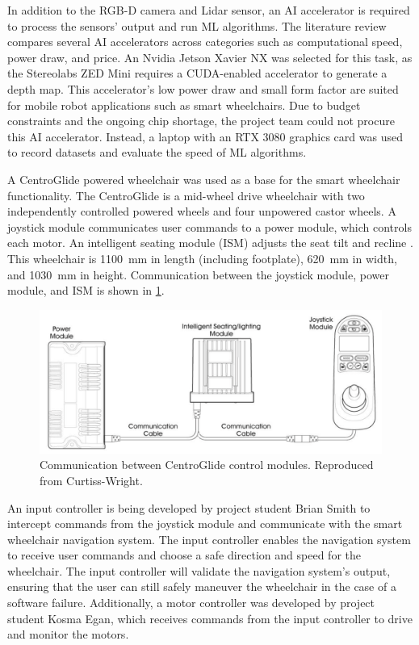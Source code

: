 In addition to the RGB-D camera and Lidar sensor, an AI accelerator is required to process the sensors'
output and run ML algorithms. The literature review compares several AI accelerators across categories
such as computational speed, power draw, and price. An Nvidia Jetson Xavier NX was selected for this task,
as the Stereolabs ZED Mini requires a CUDA-enabled accelerator to generate a depth map. This accelerator's
low power draw and small form factor are suited for mobile robot applications such as smart wheelchairs.
Due to budget constraints and the ongoing chip shortage, the project team could not procure this AI accelerator.
Instead, a laptop with an RTX 3080 graphics card was used to record datasets and evaluate the speed of
ML algorithms.

A CentroGlide powered wheelchair was used as a base for the smart wheelchair functionality.
The CentroGlide is a mid-wheel drive wheelchair with two independently controlled powered wheels and four
unpowered castor wheels.
A joystick module communicates user commands to a power module, which controls
each motor. An intelligent seating module (ISM) adjusts the seat tilt and recline \cite{glideCentroGlideOWNERUSER2022}.
This wheelchair is \SI{1100}{\milli\metre} in length (including footplate), \SI{620}{\milli\metre}
in width, and \SI{1030}{\milli\metre} in height.
Communication between the joystick module, power module, and ISM is shown in \cref{fig:module_communication}.

\begin{figure}[b]
    \centering
    \includegraphics[width=0.85\linewidth]{images/module_communication.png}
    \caption{Communication between CentroGlide control modules. Reproduced from Curtiss-Wright. \cite{curtiss-wrightPGDRIVESTECHNOLOGY2016}}
    \label{fig:module_communication}
\end{figure}

An input controller is being developed by project student Brian Smith to intercept
commands from the joystick module and communicate with the smart wheelchair navigation system.
The input controller enables the navigation system to receive user commands and choose a safe
direction and speed for the wheelchair.
The input controller will validate the
navigation system's output, ensuring that the user
can still safely maneuver the wheelchair in the case of a software failure.
Additionally, a motor controller was developed by project student
Kosma Egan, which receives commands from the input controller to drive and monitor the motors.
\pagebreak

